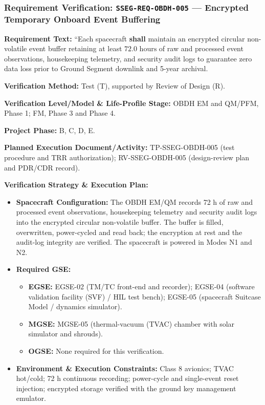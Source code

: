 \subsubsection{Requirement Verification: \texttt{SSEG-REQ-OBDH-005} --- Encrypted Temporary Onboard Event Buffering}
\label{ver:SSEG-REQ-OBDH-005}
\textbf{Requirement Text:} ``Each spacecraft \textbf{shall} maintain an encrypted circular non-volatile event buffer retaining at least $72.0\text{ hours}$ of raw and processed event observations, housekeeping telemetry, and security audit logs to guarantee zero data loss prior to Ground Segment downlink and 5-year archival.
\par\textbf{Verification Method:} Test (T), supported by Review of Design (R).
\par\textbf{Verification Level/Model \& Life-Profile Stage:} OBDH EM and QM/PFM, Phase 1; FM, Phase 3 and Phase 4.
\par\textbf{Project Phase:} B, C, D, E.
\par\textbf{Planned Execution Document/Activity:} TP-SSEG-OBDH-005 (test procedure and TRR authorization); RV-SSEG-OBDH-005 (design-review plan and PDR/CDR record).
\par\textbf{Verification Strategy \& Execution Plan:}
\begin{itemize}
\item \textbf{Spacecraft Configuration:} The OBDH EM/QM records 72 h of raw and processed event observations, housekeeping telemetry and security audit logs into the encrypted circular non-volatile buffer. The buffer is filled, overwritten, power-cycled and read back; the encryption at rest and the audit-log integrity are verified. The spacecraft is powered in Modes N1 and N2.
\item \textbf{Required GSE:}
\begin{itemize}
\item \textbf{EGSE:} EGSE-02 (TM/TC front-end and recorder); EGSE-04 (software validation facility (SVF) / HIL test bench); EGSE-05 (spacecraft Suitcase Model / dynamics simulator).
\item \textbf{MGSE:} MGSE-05 (thermal-vacuum (TVAC) chamber with solar simulator and shrouds).
\item \textbf{OGSE:} None required for this verification.
\end{itemize}
\item \textbf{Environment \& Execution Constraints:} Class 8 avionics; TVAC hot/cold; 72 h continuous recording; power-cycle and single-event reset injection; encrypted storage verified with the ground key management emulator.
\end{itemize}
